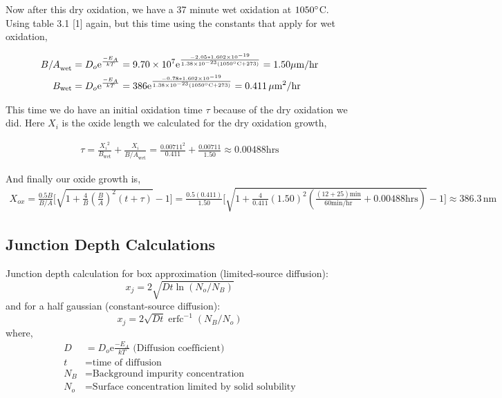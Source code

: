 \documentclass{article}
\newcommand{\me}{\mathrm{e}}
\providecommand{\e}[1]{\ensuremath{\times 10^{#1}}}
\DeclareMathOperator\erfc{erfc}
\begin{document}
Now after this dry oxidation, we have a 37 minute wet oxidation at $1050 \degree$C. Using table 3.1 [1] again, but this time using the constants that apply for wet oxidation,

\begin{align*}
{B/A}_{\text{wet}} &= D_o\me^{\frac{-E_A}{kT}} = 9.70\e{7}\me^{\frac{-2.05*1.602\e{-19}}{1.38\e{-23}(1050\degree\text{C} + 273)}} = 1.50 \mu\text{m/hr} \\
B_{\text{wet}} &= D_o\me^{\frac{-E_A}{kT}} = 386\me^{\frac{-0.78*1.602\e{-19}}{1.38\e{-23}(1050\degree\text{C} + 273)}} = 0.411 \,{\mu\text{m}}^2\text{/hr}
\end{align*}

This time we do have an initial oxidation time $\tau$ because of the dry oxidation we did. Here $X_i$ is the oxide length we calculated for the dry oxidation growth,

\begin{align*}
\tau = \frac{{X_i}^2}{B_{\text{wet}}} + \frac{X_i}{{B/A}_{\text{wet}}} = \frac{0.00711^2}{0.411} + \frac{0.00711}{1.50} \approx 0.00488 \text{hrs}
\end{align*}

And finally our oxide growth is,
\begin{align*}
X_{ox} = \frac{0.5B}{B/A}\Big[\sqrt{1 + \frac{4}{B}(\frac{B}{A})^2(t + \tau)} - 1\Big] = \frac{0.5 (0.411)}{1.50}\Big[\sqrt{1 + \frac{4}{0.411}(1.50)^2(\frac{(12 + 25)\text{min}}{60\text{min/hr}} + 0.00488 \text{hrs})} - 1\Big] \approx 386.3 \, \text{nm}
\end{align*}

\subsection{Junction Depth Calculations}
\label{sec:jdepth}
Junction depth calculation for box approximation (limited-source diffusion):
\begin{equation}
x_j = 2\sqrt{Dt \ln{(N_o/N_B)}}
\end{equation}
and for a half gaussian (constant-source diffusion):
\begin{equation}
x_j = 2\sqrt{Dt}\erfc^{-1}{(N_B/N_o)}
\end{equation}
where,
\begin{align*}
D &= D_o\me{\frac{-E_A}{kT}} \,\,\text{(Diffusion coefficient)} \\ 
t &= \text{time of diffusion} \\
N_B &= \text{Background impurity concentration} \\ 
N_o &= \text{Surface concentration limited by solid solubility}
\end{align*}
\end{document}
